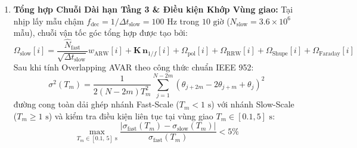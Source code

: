 \documentclass[11pt, a4paper]{article}
\begin{document}
\begin{enumerate}
    \item \textbf{Tổng hợp Chuỗi Dài hạn Tầng 3 \& Điều kiện Khớp Vùng giao:}
    Tại nhịp lấy mẫu chậm $f_{\text{dec}} = 1/\Delta t_{\text{slow}} = 100\text{ Hz}$ trong $10\text{ giờ}$ ($N_{\text{slow}} = 3.6 \times 10^6$ mẫu), chuỗi vận tốc góc tổng hợp được tạo bởi:
    \begin{equation}
    \Omega_{\text{slow}}[i] = \frac{\hat{N}_{\text{fast}}}{\sqrt{\Delta t_{\text{slow}}}} w_{\text{ARW}}[i] + \mathbf{K}\,\mathbf{n}_{1/f}[i] + \Omega_{\text{pol}}[i] + \Omega_{\text{RRW}}[i] + \Omega_{\text{Shupe}}[i] + \Omega_{\text{Faraday}}[i]
    \end{equation}
    Sau khi tính Overlapping AVAR theo công thức chuẩn IEEE 952:
    \begin{equation}
    \sigma^2(T_m) = \frac{1}{2(N-2m)T_m^2}\sum_{j=1}^{N-2m}(\theta_{j+2m}-2\theta_{j+m}+\theta_j)^2
    \end{equation}
    đường cong toàn dải ghép nhánh Fast-Scale ($T_m < 1\text{ s}$) với nhánh Slow-Scale ($T_m \ge 1\text{ s}$) và kiểm tra điều kiện liên tục tại vùng giao $T_m \in [0.1, 5]\text{ s}$:
    \begin{equation}
    \max_{T_m \in [0.1,\, 5]\text{ s}} \frac{\bigl|\sigma_{\text{fast}}(T_m) - \sigma_{\text{slow}}(T_m)\bigr|}{\sigma_{\text{fast}}(T_m)} < 5\%
    \end{equation}
\end{enumerate}
\end{document}

